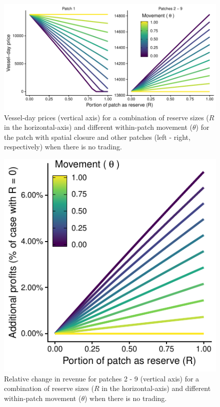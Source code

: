 \documentclass[12pt]{article}
\begin{document}
\begin{figure}[htbp]
\centering
\includegraphics{img/vessel_day_price_no_trading_plot.pdf}
\caption{\label{fig:vessel_day_price_no_trading_plot}Vessel-day prices (vertical axis) for a combination of reserve sizes ($R$ in the horizontal-axis) and different within-patch movement ($\theta$) for the patch with spatial closure and other patches (left - right, respectively) when there is no trading.}
\end{figure}

\begin{figure}[htbp]
\centering
\includegraphics{img/profits_PNA_notKIR_no_trading_plot.pdf}
\caption{\label{fig:profits_PNA_notKIR_no_trading_plot}Relative change in revenue for patches 2 - 9 (vertical axis) for a combination of reserve sizes ($R$ in the horizontal-axis) and different within-patch movement ($\theta$) when there is no trading.}
\end{figure}
\end{document}
